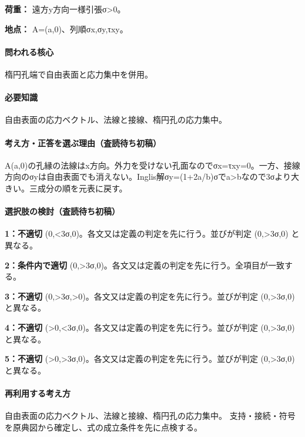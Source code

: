 \noindent\textbf{荷重：} 遠方y方向一様引張σ>0。\par

\noindent\textbf{地点：} A=\allowbreak{}(a,0)、列順σx,σy,τxy。\par

\paragraph{問われる核心} 楕円孔端で自由表面と応力集中を併用。

\paragraph{必要知識} 自由表面の応力ベクトル、法線と接線、楕円孔の応力集中。

\paragraph{考え方・正答を選ぶ理由（査読待ち初稿）} A(a,0)の孔縁の法線はx方向。外力を受けない孔面なのでσx=τxy=\allowbreak{}0。一方、接線方向のσyは自由表面でも消えない。Inglis解σy=\allowbreak{}(1+2a/b)σでa>bなので3σより大きい。三成分の順を元表に戻す。

\paragraph{選択肢の検討（査読待ち初稿）}\mbox{}\par

\noindent\textbf{1：不適切} (0,<3σ,0)。各文又は定義の判定を先に行う。並びが判定 (0,>3σ,0) と異なる。\par

\noindent\textbf{2：条件内で適切} (0,>3σ,0)。各文又は定義の判定を先に行う。全項目が一致する。\par

\noindent\textbf{3：不適切} (0,>3σ,>0)。各文又は定義の判定を先に行う。並びが判定 (0,>3σ,0) と異なる。\par

\noindent\textbf{4：不適切} (>0,<3σ,0)。各文又は定義の判定を先に行う。並びが判定 (0,>3σ,0) と異なる。\par

\noindent\textbf{5：不適切} (>0,>3σ,0)。各文又は定義の判定を先に行う。並びが判定 (0,>3σ,0) と異なる。\par

\paragraph{再利用する考え方} 自由表面の応力ベクトル、法線と接線、楕円孔の応力集中。 支持・接続・符号を原典図から確定し、式の成立条件を先に点検する。

